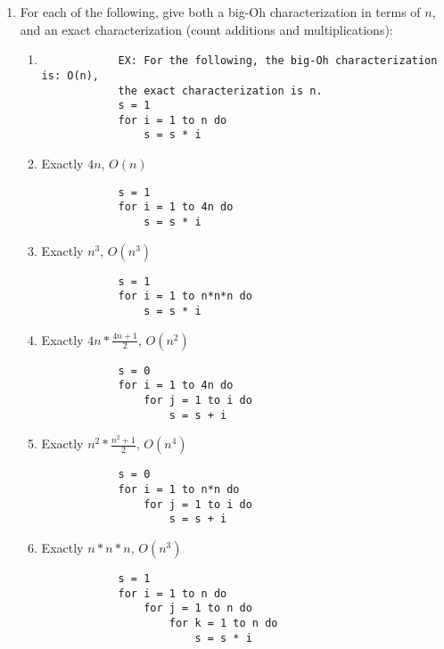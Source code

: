 \documentclass[11pt]{article}
\begin{document}
\begin{enumerate}[leftmargin=*]
\item For each of the following, give both a big-Oh characterization in terms of $n$, and an exact characterization (count additions and multiplications):
        \begin{enumerate}
            \item
            \begin{verbatim}
            EX: For the following, the big-Oh characterization is: O(n), 
            the exact characterization is n.
            s = 1
            for i = 1 to n do
                s = s * i
            \end{verbatim}
            \item Exactly $4n$, $O(n)$
            \begin{verbatim}
            s = 1
            for i = 1 to 4n do
                s = s * i
            \end{verbatim}
            \item Exactly $n^3$, $O(n^3)$
            \begin{verbatim}
            s = 1
            for i = 1 to n*n*n do
                s = s * i
            \end{verbatim}
            \item Exactly $4n * \frac{4n+1}{2}$, $O(n^2)$
            \begin{verbatim}
            s = 0
            for i = 1 to 4n do
                for j = 1 to i do
                    s = s + i
            \end{verbatim}
            \item Exactly $n^2 * \frac{n^2+1}{2}$, $O(n^4)$
            \begin{verbatim}
            s = 0
            for i = 1 to n*n do
                for j = 1 to i do
                    s = s + i
            \end{verbatim}
            \item Exactly $n*n*n$, $O(n^3)$
            \begin{verbatim}
            s = 1
            for i = 1 to n do
                for j = 1 to n do
                    for k = 1 to n do
                        s = s * i
            \end{verbatim}
        \end{enumerate}

\end{enumerate}

\label{r:lastpage}
\end{document}
